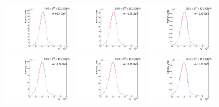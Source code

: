 \begin{figure}[h!]
    \centering
          \includegraphics[width=0.32\textwidth]{detector/l1jet/gaussfits//ptBin_0_PtAll_u.pdf}
          \includegraphics[width=0.32\textwidth]{detector/l1jet/gaussfits//ptBin_1_PtAll_u.pdf}
          \includegraphics[width=0.32\textwidth]{detector/l1jet/gaussfits//ptBin_2_PtAll_u.pdf}\\
          \includegraphics[width=0.32\textwidth]{detector/l1jet/gaussfits//ptBin_3_PtAll_u.pdf}
          \includegraphics[width=0.32\textwidth]{detector/l1jet/gaussfits//ptBin_4_PtAll_u.pdf}
          \includegraphics[width=0.32\textwidth]{detector/l1jet/gaussfits//ptBin_5_PtAll_u.pdf}\\

\end{figure}
